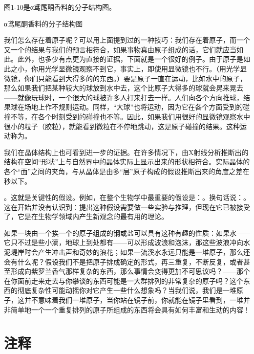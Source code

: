 \documentclass[12pt,oneside]{book}
\begin{document}
\begin{common-format}
图1-10是α鸢尾酮香料的分子结构图。
\begin{fig}{α鸢尾酮香料的分子结构图}
\caption{α鸢尾酮香料的分子结构图}
\label{fig:α鸢尾酮香料的分子结构图}
\end{fig}

我们怎么存在着原子呢？可以用上面提到过的一种技巧：我们存在着原子，而一个又一个的结果与我们的预言相符合，如果事物真由原子组成的话，它们就应当如此。此外，也多少有点更为直接的证据，下面就是一个很好的例子。由于原子是如此之小，你用光学显微镜观察不到它，事实上，即使用显微镜也不行。（用光学显微镜，你们只能看到大得多的的东西。）要是原子一直在运动，比如水中的原子，那么如果我们把某种较大的球放到水中去，这个比原子大得多的球就会晃来晃去——就像玩球时，一个很大的球被许多人打来打去一样。人们向各个方向推球，结果球在场地上作不规则运动。同样，“大球”也将运动，因为它在各个方面受到的碰撞不等，在各个时刻受到的碰撞也不等。因此，如果我们用很好的显微镜观察水中很小的粒子（胶粒），就能看到微粒在不停地跳动，这是原子碰撞的结果。这种运动称为。

我们在晶体结构上也可看到进一步的证据。在许多情况下，由X射线分析推断出的结构在空间“形状”上与自然界中的晶体实际上显示出来的形状相符合。实际晶体的各个“面”之间的夹角，与从晶体是由多“层”原子构成的假设推断出来的角度之差在秒以下。

。这就是关键性的假设。例如，在整个生物学中最重要的假设是：。换句话说：。这在开始并没有认识到：提出这种假设需要做一些实验与推理，但现在它已被接受了，它是在生物学领域内产生新观念的最有用的理论。

如果一块由一个挨一个的原子组成的钢或盐可以具有这种有趣的性质：如果水——它只不过是些小滴，地球上到处都有——可以形成波浪和泡沫，那这些波浪冲向水泥堤岸时会产生冲击声和奇妙的浪花；如果一流溪水永远只能是一堆原子，那么还会有什么呢？假设我们不是把原子排成确定的形式，再三重复，不断反复，或者甚至形成向紫罗兰香气那样复杂的东西，那么事情会变得更加不可思议吗？——那个在你面前走来走去与你攀谈的东西可能是一大群排列的非常复杂的原子吗？这个东西的彻底复杂性可能动摇你对它产生一些什么想象吗？当我们说，我们是一堆原子，这并不意味着我们一堆原子，当你站在镜子前，你就能在镜子里看到，一堆并非简单地一个一个重复排列的原子所组成的东西将会具有如何丰富和生动的内容！


\section{注释}
\showendnotes





\end{common-format}
\end{document}
